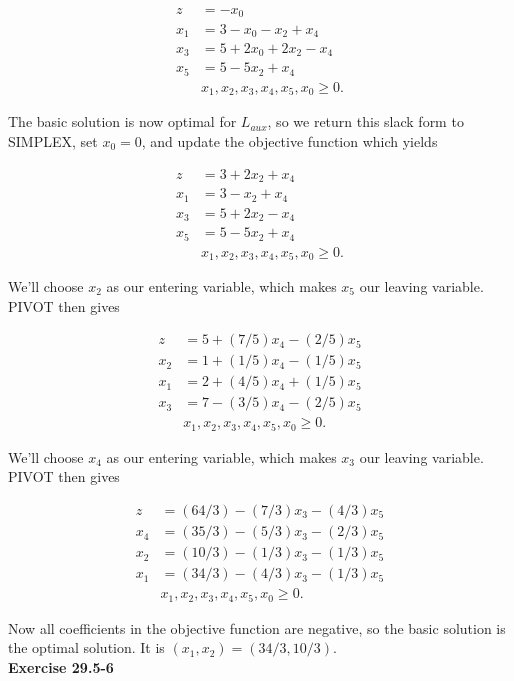 \documentclass{article}
\begin{document}
\begin{align*}
z &= -x_0\\
x_1 &= 3 - x_0 - x_2 + x_4 \\
x_3 &= 5 + 2x_0 + 2x_2 - x_4\\
x_5 &= 5 - 5x_2 + x_4 \\
& x_1,x_2,x_3, x_4, x_5, x_0 \geq 0.
\end{align*}

The basic solution is now optimal for $L_{aux}$, so we return this slack form to SIMPLEX, set $x_0 = 0$, and update the objective function which yields

\begin{align*}
z &= 3 + 2x_2 + x_4\\
x_1 &= 3 - x_2 + x_4 \\
x_3 &= 5 + 2x_2 - x_4\\
x_5 &= 5 - 5x_2 + x_4 \\
& x_1,x_2,x_3, x_4, x_5, x_0 \geq 0.
\end{align*}

We'll choose $x_2$ as our entering variable, which makes $x_5$ our leaving variable.  PIVOT then gives 

\begin{align*}
z &= 5 + (7/5)x_4 - (2/5)x_5\\
x_2 &= 1 + (1/5)x_4 - (1/5)x_5 \\
x_1 &= 2 + (4/5)x_4 + (1/5)x_5\\
x_3 &= 7 - (3/5)x_4 - (2/5)x_5 \\
& x_1,x_2,x_3, x_4, x_5, x_0 \geq 0.
\end{align*}

We'll choose $x_4$ as our entering variable, which makes $x_3$ our leaving variable.  PIVOT then gives

\begin{align*}
z &= (64/3) - (7/3)x_3 - (4/3)x_5\\
x_4 &=  (35/3) - (5/3)x_3 - (2/3)x_5 \\
x_2 &= (10/3) - (1/3)x_3 - (1/3)x_5\\
x_1 &= (34/3) - (4/3)x_3 - (1/3)x_5 \\
& x_1,x_2,x_3, x_4, x_5, x_0 \geq 0.
\end{align*}

Now all coefficients in the objective function are negative, so the basic solution is the optimal solution.  It is $(x_1, x_2) = (34/3, 10/3)$. \\

\noindent\textbf{Exercise 29.5-6}\\
\end{document}
